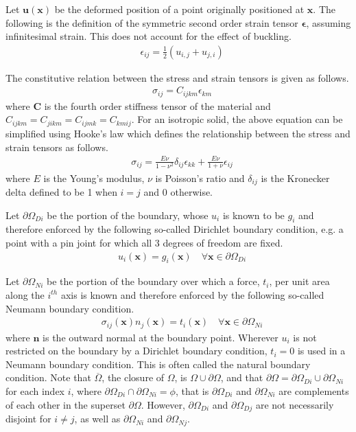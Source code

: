 	Let $\bm{u}(\bm{x})$ be the deformed position of a point originally positioned at $\bm{x}$. The following is the definition of the symmetric second order strain tensor $\bm{\epsilon}$, assuming infinitesimal strain. This does not account for the effect of buckling.
	\begin{align} \label{strain}
		& \epsilon_{ij} = \frac{1}{2}(u_{i,j} + u_{j,i})
	\end{align}

	The constitutive relation between the stress and strain tensors is given as follows.
	\begin{align} \label{constitutive}
		& \sigma_{ij} = C_{ijkm} \epsilon_{km}
	\end{align}
	where $\bm{C}$ is the fourth order stiffness tensor of the material and $C_{ijkm} = C_{jikm} = C_{ijmk} = C_{kmij}$. For an isotropic solid, the above equation can be simplified using Hooke's law which defines the relationship between the stress and strain tensors as follows.
	\begin{align}
		& \sigma_{ij} = \frac{E\nu}{1-\nu^2} \delta_{ij} \epsilon_{kk} + \frac{E\nu}{1+\nu} \epsilon_{ij}
	\end{align}
	where $E$ is the Young's modulus, $\nu$ is Poisson's ratio and $\delta_{ij}$ is the Kronecker delta defined to be 1 when $i = j$ and 0 otherwise.

	Let $\partial\Omega_{Di}$ be the portion of the boundary, whose $u_i$ is known to be $g_i$ and therefore enforced by the following so-called Dirichlet boundary condition, e.g. a point with a pin joint for which all 3 degrees of freedom are fixed.
	\begin{align} \label{dirichlet}
		& u_i(\bm{x}) = g_i(\bm{x}) \quad \forall \bm{x} \in \partial \Omega_{Di}
	\end{align}

	Let $\partial\Omega_{Ni}$ be the portion of the boundary over which a force, $t_i$, per unit area along the $i^{th}$ axis is known and therefore enforced by the following so-called Neumann boundary condition. 
	\begin{align} \label{neumann}
		& \sigma_{ij}(\bm{x})n_{j}(\bm{x}) = t_{i}(\bm{x}) \quad \forall \bm{x} \in \partial \Omega_{Ni}
	\end{align}
	where $\bm{n}$ is the outward normal at the boundary point. Wherever $u_i$ is not restricted on the boundary by a Dirichlet boundary condition, $t_i = 0$ is used in a Neumann boundary condition. This is often called the natural boundary condition. Note that $\overline{\Omega}$, the closure of $\Omega$, is $\Omega \cup \partial\Omega$, and that $\partial\Omega = \partial\Omega_{Di} \cup \partial\Omega_{Ni}$ for each index $i$, where $\partial\Omega_{Di} \cap \partial\Omega_{Ni} = \phi$, that is $\partial\Omega_{Di}$ and $\partial\Omega_{Ni}$ are complements of each other in the superset $\partial\Omega$. However, $\partial\Omega_{Di}$ and $\partial\Omega_{Dj}$ are not necessarily disjoint for $i \neq j$, as well as $\partial\Omega_{Ni}$ and $\partial\Omega_{Nj}$.

